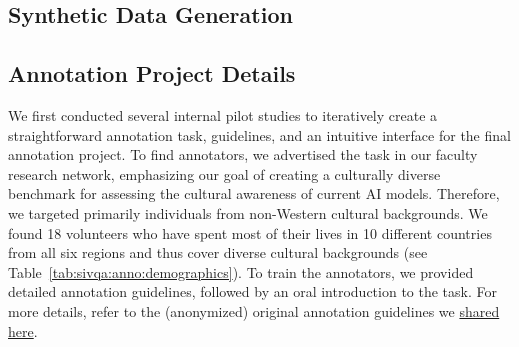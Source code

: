 \subsection{Synthetic Data Generation}
\label{appendix:sec:sivqa:synth}
%

%

\subsection{Annotation Project Details}
\label{appendix:sec:sivqa:anno}
%
We first conducted several internal pilot studies to iteratively create a straightforward annotation task, guidelines, and an intuitive interface for the final annotation project.
%
To find annotators, we advertised the task in our faculty research network, emphasizing our goal of creating a culturally diverse benchmark for assessing the cultural awareness of current AI models.
%
Therefore, we targeted primarily individuals from non-Western cultural backgrounds.
%
We found 18 volunteers who have spent most of their lives in 10 different countries from all six regions and thus cover diverse cultural backgrounds (see Table~\ref{tab:sivqa:anno:demographics}).
%
To train the annotators, we provided detailed annotation guidelines, followed by an oral introduction to the task.
%
For more details, refer to the (anonymized) original annotation guidelines we \href{https://drive.proton.me/urls/T6RHQCEW5G#5y0Itm2BdWYZ}{shared here}.
%

